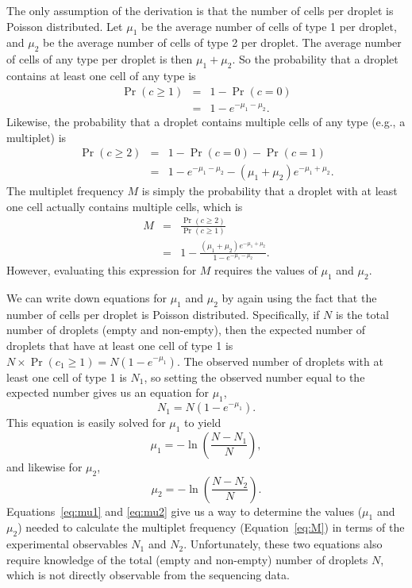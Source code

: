 \documentclass[fleqn,10pt]{wlpeerj} %
\begin{document}
The only assumption of the derivation is that the number of cells per droplet is Poisson distributed.
Let $\mu_1$ be the average number of cells of type 1 per droplet, and $\mu_2$ be the average number of cells of type 2 per droplet.
The average number of cells of any type per droplet is then $\mu_1 + \mu_2$.
So the probability that a droplet contains at least one cell of any type is
\begin{eqnarray}
\label{eq:Pr1}
\Pr\left(c \ge 1\right) &=& 1 - \Pr\left(c = 0 \right) \nonumber \\
&=& 1 - e^{-\mu_1 - \mu_2}.
\end{eqnarray}
Likewise, the probability that a droplet contains multiple cells of any type (e.g., a multiplet) is
\begin{eqnarray}
\label{eq:Pr2}
\Pr\left(c \ge 2\right) &=& 1 - \Pr\left(c = 0\right) - \Pr\left(c = 1\right) \nonumber \\
&=& 1 - e^{-\mu_1 - \mu_2} - \left(\mu_1 + \mu_2\right) e^{-\mu_1 + \mu_2}.
\end{eqnarray}
The multiplet frequency $M$ is simply the probability that a droplet with at least one cell actually contains multiple cells, which is
\begin{eqnarray}
\label{eq:M}
M &=& \frac{\Pr\left(c \ge 2\right)}{\Pr\left(c \ge 1\right)} \nonumber \\
&=& 1 - \frac{\left(\mu_1 + \mu_2\right) e^{-\mu_1 + \mu_2}}{1 - e^{-\mu_1 - \mu_2}}.
\end{eqnarray}
However, evaluating this expression for $M$ requires the values of $\mu_1$ and $\mu_2$.

We can write down equations for $\mu_1$ and $\mu_2$ by again using the fact that the number of cells per droplet is Poisson distributed.
Specifically, if $N$ is the total number of droplets (empty and non-empty), then the expected number of droplets that have at least one cell of type 1 is $N \times \Pr\left(c_1 \ge 1\right) = N \left(1 - e^{-\mu_1}\right)$.
The observed number of droplets with at least one cell of type 1 is $N_1$, so setting the observed number equal to the expected number gives us an equation for $\mu_1$,
\begin{equation}
N_1 = N \left(1 - e^{-\mu_1}\right).
\end{equation}
This equation is easily solved for $\mu_1$ to yield
\begin{equation}
\label{eq:mu1}
\mu_1 = -\ln\left(\frac{N - N_1}{N}\right),
\end{equation}
and likewise for $\mu_2$,
\begin{equation}
\label{eq:mu2}
\mu_2 = -\ln\left(\frac{N - N_2}{N}\right).
\end{equation}
Equations~\ref{eq:mu1} and \ref{eq:mu2} give us a way to determine the values ($\mu_1$ and $\mu_2$) needed to calculate the multiplet frequency (Equation~\ref{eq:M}) in terms of the experimental observables $N_1$ and $N_2$.
Unfortunately, these two equations also require knowledge of the total (empty and non-empty) number of droplets $N$, which is not directly observable from the sequencing data.
\end{document}
